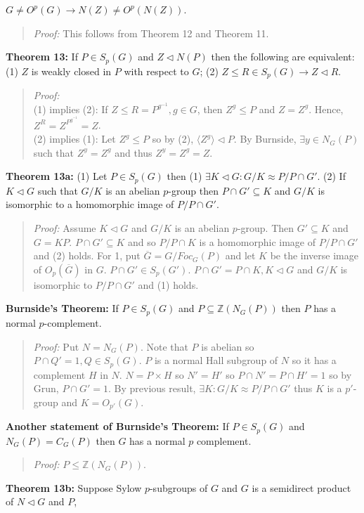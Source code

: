 $G \ne O^p(G) \rightarrow N(Z) \ne O^p(N(Z))$.
\begin{quote}
\emph{Proof:}  
This follows from Theorem 12 and Theorem 11.
\end{quote}
{\bf Theorem 13:} If
$P \in S_p(G)$ and $Z \lhd N(P)$ then the following are equivalent:
(1) $Z$ is weakly closed in $P$ with respect to $G$;
(2) $Z \le R \in S_p(G) \rightarrow Z \lhd R$.
\begin{quote}
\emph{Proof:} 
\\
(1) implies (2): If $Z \le R = P^{g^{-1}}, g \in G$, then $Z^g \le P$ and $Z=Z^g$.
Hence, $Z^R= Z^{P^{g^{-1}}} = Z$.\\
(2) implies (1):  Let $Z^g \le P$ so by (2), $ \langle Z^g \rangle \lhd P$.  
By Burnside, $\exists y \in N_G(P)$
such that  $Z^y=Z^g$ and thus $Z^y=Z^g=Z$.
\end{quote}
{\bf Theorem 13a:}  (1) Let $P \in S_p(G)$ then (1) $\exists K \lhd G: G/K \approx P/ P \cap G'$.
(2) If $K \lhd G$ such that $G/K$ is an abelian $p$-group then $P \cap G' \subseteq K$ 
and $G/K$ is isomorphic to a homomorphic image of $P/P \cap G'$.
\begin{quote}
\emph{Proof:}  Assume $K \lhd G$ and $G/K$ is an abelian $p$-group.  Then $G' \subseteq K$ and
$G= KP$.  $P \cap G' \subseteq K$ and so $P/P \cap K$ is a homomorphic image of $P/P \cap G'$ and (2)
holds.  For 1, put ${\overline G} = G/Foc_G(P)$ and let
$K$ be the inverse image of $O_{p}({\overline G})$
in $G$.  $P \cap G' \in S_p(G')$.  
$P \cap G' = P \cap K, K \lhd G$ and $G/K$ is isomorphic to $P/P \cap G'$ and (1) holds.
\end{quote}
{\bf Burnside's Theorem:} 
If $P \in S_p(G)$ and $P \subseteq {\mathbb Z}(N_G(P))$ then $P$ has a normal
$p$-complement.
\begin{quote}
\emph{Proof:}  Put $N=N_G(P)$.  Note that $P$ is abelian so $P \cap Q'= 1, Q \in S_p(G)$.
$P$ is a normal Hall subgroup of $N$ so it has a complement $H$ in $N$.  $N= P \times H$ so
$N' = H'$ so $P \cap N' = P \cap H' = 1$ so by Grun, $P \cap G'=1$.  By previous result, $\exists K:
G/K \approx P/P \cap G'$ thus $K$ is a $p'$-group and $K= O_{p'}(G)$.
\end{quote}
{\bf Another statement of Burnside's Theorem:} 
If $P \in S_p(G)$ and $N_G(P) = C_G(P)$ then $G$ has a normal $p$ complement.
\begin{quote}
\emph{Proof:} 
$P \leq {\mathbb Z}(N_G(P))$.
\end{quote}
{\bf Theorem 13b:} Suppose Sylow $p$-subgroups of $G$ and $G$ is a semidirect product of $N \lhd G$ and $P$,
